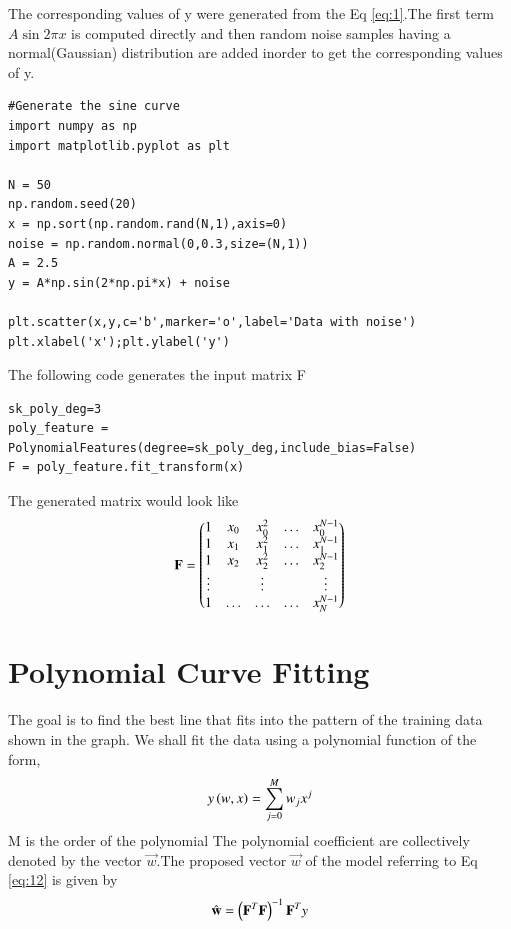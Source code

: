 \documentclass[journal,12pt,twocolumn]{IEEEtran}
\begin{document}
The corresponding values of y were generated from the Eq \eqref{eq:1}.The first term $A\sin{2\pi x}$ is computed directly and then random noise samples having a normal(Gaussian) distribution are added inorder to get the corresponding values of y.
\begin{lstlisting}
#Generate the sine curve 
import numpy as np
import matplotlib.pyplot as plt

N = 50
np.random.seed(20)
x = np.sort(np.random.rand(N,1),axis=0)
noise = np.random.normal(0,0.3,size=(N,1))
A = 2.5
y = A*np.sin(2*np.pi*x) + noise

plt.scatter(x,y,c='b',marker='o',label='Data with noise')
plt.xlabel('x');plt.ylabel('y')
\end{lstlisting}

The following code generates the input matrix F
\begin{lstlisting}
sk_poly_deg=3
poly_feature = PolynomialFeatures(degree=sk_poly_deg,include_bias=False)
F = poly_feature.fit_transform(x)
\end{lstlisting}

The generated matrix would look like
\begin{align}
    \mathbf{F}= \begin{pmatrix} 1 & x_{0} & x_{0}^2 & \ldots & x_{0}^{N-1} \\
		1 & x_{1} & x_{1}^2 & \ldots & x_{1}^{N-1} \\
		1 & x_{2} & x_{2}^2 & \ldots & x_{2}^{N-1} \\
		\vdots & & \vdots &  & \vdots  \\
		    1 & \ldots & \ldots & \ldots & x_{N}^{N-1} \end{pmatrix}\label{eq:12}
\end{align}
\section{Polynomial Curve Fitting}
The goal is to find the best line that fits into the  pattern of the training data shown in the graph.
We shall fit the data using a polynomial function of the form, 
\begin{align}
     y\left(w,x\right)= \sum_{j=0}^{M} w_j x^{j}\\
\end{align}
M is the order of the polynomial
The polynomial coefficient are collectively denoted by the vector $\vec{w}$.The proposed vector $\vec{w}$ of the model referring to Eq \eqref{eq:12} is given by 
\begin{align}
    \hat{\mathbf{w}} = \left(\mathbf{F}^T\mathbf{F}\right)^{-1}\mathbf{F}^Ty \label{eq:13}
\end{align}
\end{document}
